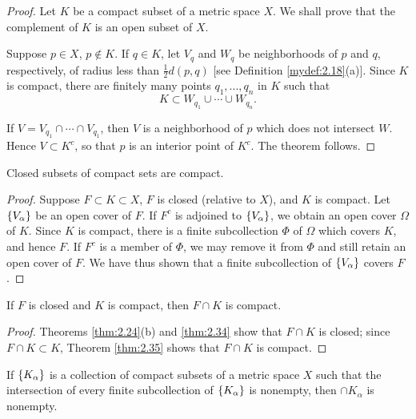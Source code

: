 \begin{proof}
    Let $K$ be a compact subset of a metric space $X$.
    We shall prove that the complement of $K$ is an open subset of $X$.

    Suppose $p \in X$, $p \not\in K$.
    If $q \in K$, let $V_q$ and $W_q$ be neighborhoods of $p$ and $q$,
    respectively, of radius less than $\tfrac{1}{2}d(p, q)$ [see Definition \ref{mydef:2.18}(a)].
    Since $K$ is compact, there are finitely many points $q_1, ..., q_n$ in $K$ such that
    \begin{equation*}
        K \subset
        W_{q_1} \cup \cdots \cup
        W_{q_n}.
    \end{equation*}

    If $V=V_{q_1} \cap \cdots \cap V_{q_1}$,
    then $V$ is a neighborhood of $p$ which does not intersect $W$.
    Hence $V \subset K^c$, so that $p$ is an interior point of $K^c$.
    The theorem follows.
\end{proof}

\begin{thm}
    \label{thm:2.35}
    Closed subsets of compact sets are compact.
\end{thm}

\begin{proof}
    Suppose $F \subset K \subset X$,
    $F$ is closed (relative to $X$),
    and $K$ is compact.
    Let $\protect\{V_\alpha\}$ be an open cover of $F$.
    If $F^c$ is adjoined to $\protect\{V_\alpha\}$,
    we obtain an open cover $\Omega$ of $K$.
    Since $K$ is compact, there is a finite subcollection $\Phi$ of $\Omega$ which covers $K$, and hence $F$.
    If $F^c$ is a member of $\Phi$,
    we may remove it from $\Phi$ and still retain an open cover of $F$.
    We have thus shown that a finite subcollection of $\protect\{V_\alpha\}$ covers $F$.
\end{proof}

\begin{myCorollary*}
    If $F$ is closed and $K$ is compact, then $F \cap K$ is compact.
\end{myCorollary*}

\begin{proof}
    Theorems \ref{thm:2.24}(b) and \ref{thm:2.34} show that $F \cap K$ is closed;
    since $F \cap K \subset K$,
    Theorem \ref{thm:2.35} shows that $F \cap K$ is compact.
\end{proof}

\begin{thm}
    \label{thm:2.36}
    If $\protect\{K_\alpha\}$ is a collection of compact subsets of a metric space $X$
    such that the intersection of every finite subcollection of $\protect\{K_\alpha\}$ is nonempty,
    then $\cap K_\alpha$ is nonempty.
\end{thm}

